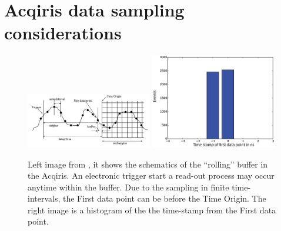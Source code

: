 \section{Acqiris data sampling considerations}\label{sec:acq-considerations}
\begin{figure}
	\centering
		\includegraphics[width=0.49\textwidth]{images/Acqiris-waveform-readout.png}
		\includegraphics[width=0.49\textwidth]{images/firstDataPoint.eps}
	\caption[First data point in Acqiris sampling.]{Left image from \citep{Acqiris-manual}, it shows the schematics of the ``rolling'' buffer in the Acqiris. An electronic trigger start a read-out process may occur anytime within the buffer. Due to the sampling in finite time-intervals, the First data point can be before the Time Origin. The right image is a histogram of the the time-stamp from the First data point.}
	\label{fig:Acqiris-waveform-readout}
\end{figure}
